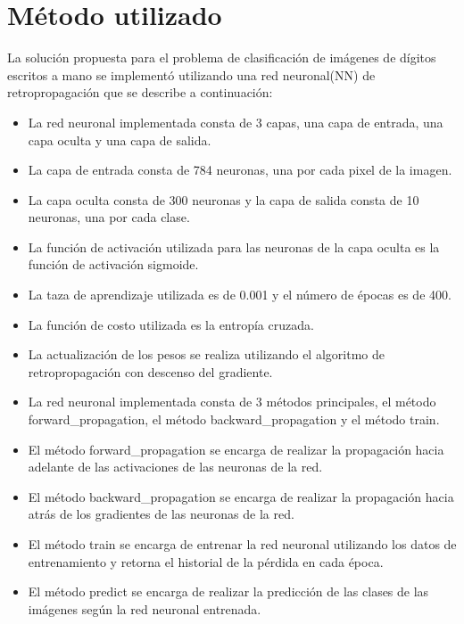 \documentclass{article}
\begin{document}
    \section{Método utilizado}\label{sec:metodo-utilizado}
    La solución propuesta para el problema de clasificación de imágenes de dígitos escritos a mano se implementó utilizando una red neuronal(NN) de retropropagación que se describe a continuación:
    \begin{itemize}
        \item La red neuronal implementada consta de 3 capas, una capa de entrada, una capa oculta y una capa de salida.
        \item La capa de entrada consta de 784 neuronas, una por cada pixel de la imagen.
        \item La capa oculta consta de 300 neuronas y la capa de salida consta de 10 neuronas, una por cada clase.
        \item La función de activación utilizada para las neuronas de la capa oculta es la función de activación sigmoide.
        \item La taza de aprendizaje utilizada es de 0.001 y el número de épocas es de 400.
        \item La función de costo utilizada es la entropía cruzada.
        \item La actualización de los pesos se realiza utilizando el algoritmo de retropropagación con descenso del gradiente.
        \item La red neuronal implementada consta de 3 métodos principales, el método forward\_propagation, el método backward\_propagation y el método train.
        \item El método forward\_propagation se encarga de realizar la propagación hacia adelante de las activaciones de las neuronas de la red.
        \item El método backward\_propagation se encarga de realizar la propagación hacia atrás de los gradientes de las neuronas de la red.
        \item El método train se encarga de entrenar la red neuronal utilizando los datos de entrenamiento y retorna el historial de la pérdida en cada época.
        \item El método predict se encarga de realizar la predicción de las clases de las imágenes según la red neuronal entrenada.
    \end{itemize}
    \clearpage
\end{document}
